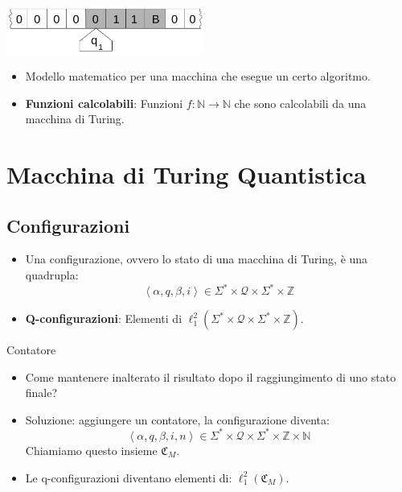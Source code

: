 \documentclass{beamer}
\begin{document}
\begin{frame}{\subsecname}{}
	\centering\includegraphics[width=6.5cm]{Turing_machine_2b.svg.png}
	\begin{itemize}
		\item Modello matematico per una macchina che esegue un certo algoritmo.
		\item \textbf{Funzioni calcolabili}: Funzioni \( f : \mathbb{N} \rightarrow \mathbb{N} \) che sono calcolabili da una macchina di Turing.
	\end{itemize}
\end{frame}

\section{Macchina di Turing Quantistica}

\subsection{Configurazioni}

\begin{frame}{\subsecname}{}
	\begin{itemize}
		\item Una configurazione, ovvero lo stato di una macchina di Turing, è una quadrupla:
		\[ \left \langle \alpha, q, \beta, i \right \rangle \in \Sigma^{*} \times \mathcal{Q} \times \Sigma^{*} \times \mathbb{Z} \]
		\item \textbf{Q-configurazioni}: Elementi di \( \ell^{2}_{1} \left ( \Sigma^{*} \times \mathcal{Q} \times \Sigma^{*} \times \mathbb{Z} \right ) \).
	\end{itemize}
\end{frame}

\begin{frame}{\subsecname}{Contatore}
	\begin{itemize}
		\item Come mantenere inalterato il risultato dopo il raggiungimento di uno stato finale?
		\item Soluzione: aggiungere un contatore, la configurazione diventa:
		\[ \left \langle \alpha, q, \beta, i, n \right \rangle \in \Sigma^{*} \times \mathcal{Q} \times \Sigma^{*} \times \mathbb{Z} \times \mathbb{N} \]
		Chiamiamo questo insieme \(\mathfrak{C}_M\).
		\item Le q-configurazioni diventano elementi di: \( \ell^{2}_{1} \left ( \mathfrak{C}_M \right ) \).
	\end{itemize}
\end{frame}
\end{document}
